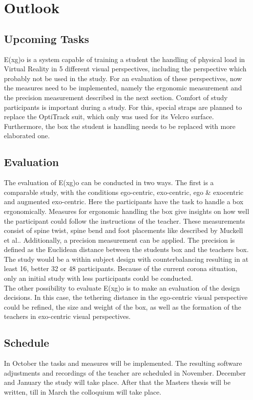 \chapter{Outlook}

\section{Upcoming Tasks}
E(x\textbar g)o is a system capable of training a student the handling of physical load in Virtual Reality in 5 different visual perspectives, including the perspective which probably not be used in the study. For an evaluation of these perspectives, now the measures need to be implemented, namely the ergonomic measurement and the precision measurement described in the next section. Comfort of study participants is important during a study. For this, special straps are planned to replace the OptiTrack suit, which only was used for its Velcro surface. Furthermore, the box the student is handling needs to be replaced with more elaborated one.

\section{Evaluation}
The evaluation of E(x\textbar g)o can be conducted in two ways. The first is a comparable study, with the conditions ego-centric, exo-centric, ego \& exocentric and augmented exo-centric. Here the participants have the task to handle a box ergonomically. Measures for ergonomic handling the box give insights on how well the participant could follow the instructions of the teacher. These measurements consist of spine twist, spine bend and foot placements like described by Muckell et al.\cite{Muckell2017}. Additionally, a precision measurement can be applied. The precision is defined as the Euclidean distance between the students box and the teachers box. The study would be a within subject design with counterbalancing resulting in at least 16, better 32 or 48 participants. Because of the current corona situation, only an initial study with less participants could be conducted.\\
The other possibility to evaluate E(x\textbar g)o is to make an evaluation of the design decisions. In this case, the tethering distance in the ego-centric visual perspective could be refined, the size and weight of the box, as well as the formation of the teachers in exo-centric visual perspectives.

\section{Schedule}
In October the tasks and measures will be implemented. The resulting software adjustments and recordings of the teacher are scheduled in November. December and January the study will take place. After that the Masters thesis will be written, till in March the colloquium will take place.